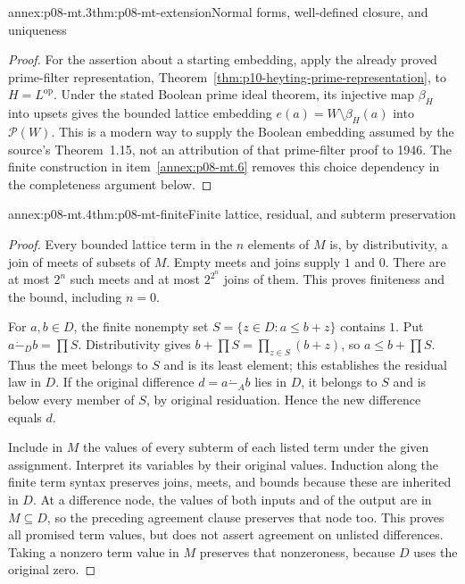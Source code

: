 \begin{annexitem}{annex:p08-mt.3}{thm:p08-mt-extension}{Normal forms, well-defined closure, and uniqueness}
\begin{proof}
For the assertion about a starting embedding, apply the already proved
prime-filter representation, Theorem~\ref{thm:p10-heyting-prime-representation},
to \(H=L^{\mathrm{op}}\). Under the stated Boolean prime ideal theorem,
its injective map \(\beta_H\) into upsets gives the bounded lattice
embedding \(e(a)=W\setminus\beta_H(a)\) into \(\mathcal P(W)\).
This is a modern way to supply the Boolean embedding assumed by the
source's Theorem~1.15, not an attribution of that prime-filter proof to
1946. The finite construction in item~\ref{annex:p08-mt.6} removes this
choice dependency in the completeness argument below.
\end{proof}
\end{annexitem}

\begin{annexitem}{annex:p08-mt.4}{thm:p08-mt-finite}{Finite lattice, residual, and subterm preservation}
\begin{proof}
Every bounded lattice term in the \(n\) elements of \(M\) is, by
distributivity, a join of meets of subsets of \(M\). Empty meets and
joins supply \(1\) and \(0\). There are at most \(2^n\) such meets
and at most \(2^{2^n}\) joins of them. This proves finiteness and the
bound, including \(n=0\).

For \(a,b\in D\), the finite nonempty set
\(S=\{z\in D:a\leq b+z\}\) contains \(1\). Put
\(a\mathbin{\dot{-}}_D b=\prod S\). Distributivity gives
\(b+\prod S=\prod_{z\in S}(b+z)\), so \(a\leq b+\prod S\).
Thus the meet belongs to \(S\) and is its least element; this establishes
the residual law in \(D\). If the original difference
\(d=a\mathbin{\dot{-}}_A b\) lies in \(D\), it belongs to \(S\)
and is below every member of \(S\), by original residuation. Hence the
new difference equals \(d\).

Include in \(M\) the values of every subterm of each listed term under
the given assignment. Interpret its variables by their original values.
Induction along the finite term syntax preserves joins, meets, and
bounds because these are inherited in \(D\). At a difference node,
the values of both inputs and of the output are in \(M\subseteq D\),
so the preceding agreement clause preserves that node too. This proves
all promised term values, but does not assert agreement on unlisted
differences. Taking a nonzero term value in \(M\) preserves that
nonzeroness, because \(D\) uses the original zero.
\end{proof}
\end{annexitem}

